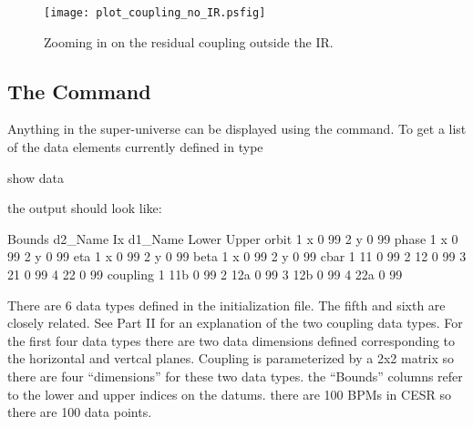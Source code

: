 \begin{figure}
  \centering
  \texttt{[image: plot\_coupling\_no\_IR.psfig]}
  \caption{Zooming in on the residual coupling outside the IR.}
  \label{f:plot_coupling_no_IR}
\end{figure}

\subsection{The  Command}

Anything in the super-universe can be displayed using the  command. To
get a list of the data elements currently defined in \tao type
\begin{example}
  show data
\end{example}
the output should look like:
\begin{example}
                                                              Bounds
     d2\_Name                       Ix  d1\_Name              Lower  Upper
     orbit
                                    1  x                      0    99
                                    2  y                      0    99
     phase
                                    1  x                      0    99
                                    2  y                      0    99
     eta
                                    1  x                      0    99
                                    2  y                      0    99
     beta
                                    1  x                      0    99
                                    2  y                      0    99
     cbar
                                    1  11                     0    99
                                    2  12                     0    99
                                    3  21                     0    99
                                    4  22                     0    99
     coupling
                                    1  11b                    0    99
                                    2  12a                    0    99
                                    3  12b                    0    99
                                    4  22a                    0    99

\end{example}
There are 6 data types defined in the initialization file. The fifth and sixth are 
closely related. See Part II for an explanation of the two coupling data types.
For the first four data types there are two data dimensions defined
corresponding to the horizontal and vertcal planes. Coupling is parameterized by
a 2x2 matrix so there are four ``dimensions'' for these two data types. the
``Bounds'' columns refer to the lower and upper indices on the datums. there are
100 BPMs in CESR so there are 100 data points.

